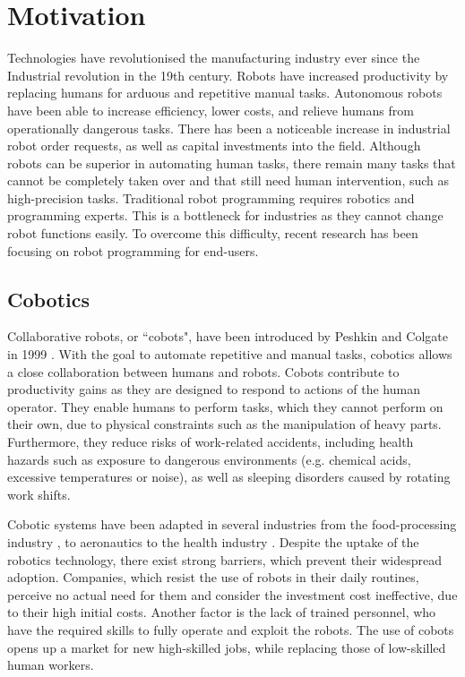 \section{Motivation}
Technologies have revolutionised the manufacturing industry ever since the Industrial revolution in the 19th century. Robots have increased productivity by replacing humans for arduous and repetitive manual tasks. Autonomous robots have been able to increase efficiency, lower costs, and relieve humans from operationally dangerous tasks. There has been a noticeable increase in industrial robot order requests, as well as capital investments into the field. Although robots can be superior in automating human tasks,  there remain many tasks that cannot be completely taken over and that still need human intervention, such as high-precision tasks. Traditional robot programming requires robotics and programming experts. This is a bottleneck for industries as they cannot change robot functions easily.
To overcome this difficulty, recent research has been focusing on robot programming for end-users.


\subsection{Cobotics}\label{subsec:Cobotics}
Collaborative robots, or ``cobots", have been introduced by Peshkin and Colgate in 1999 \cite{colgate1999cobots}. With the goal to automate repetitive and manual tasks, cobotics allows a close collaboration between humans and robots. Cobots contribute to productivity gains as they are designed to respond to actions of the human operator. They enable humans to perform tasks, which they cannot perform on their own, due to physical constraints such as the manipulation of heavy parts. Furthermore, they reduce risks of work-related accidents, including health hazards such as exposure to dangerous environments (e.g. chemical acids, excessive temperatures or noise), as well as sleeping disorders caused by rotating work shifts. 

Cobotic systems have been adapted in several industries from the food-processing industry \cite{Food}, to aeronautics \cite{Airbus} to the health industry \cite{Ebola}. Despite the uptake of the robotics technology, there exist strong barriers, which prevent their widespread adoption. Companies, which resist the use of robots in their daily routines, perceive no actual need for them and consider the investment cost ineffective, due to their high initial costs. Another factor is the lack of trained personnel, who have the required skills to fully operate and exploit the robots. The use of cobots opens up a market for new high-skilled jobs, while replacing those of low-skilled human workers.



